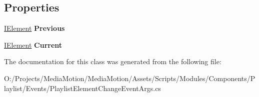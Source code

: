 \subsection*{Properties}
\begin{DoxyCompactItemize}
\item 
\hypertarget{class_media_motion_1_1_modules_1_1_components_1_1_playlist_1_1_events_1_1_playlist_element_change_event_args_a2e8e1d85d13e7c7d96deb54bdb919fdf}{\hyperlink{interface_media_motion_1_1_core_1_1_models_1_1_interfaces_1_1_i_element}{I\+Element} {\bfseries Previous}}\label{class_media_motion_1_1_modules_1_1_components_1_1_playlist_1_1_events_1_1_playlist_element_change_event_args_a2e8e1d85d13e7c7d96deb54bdb919fdf}

\item 
\hypertarget{class_media_motion_1_1_modules_1_1_components_1_1_playlist_1_1_events_1_1_playlist_element_change_event_args_a11fd9c96208baf04f8ed428cddb37578}{\hyperlink{interface_media_motion_1_1_core_1_1_models_1_1_interfaces_1_1_i_element}{I\+Element} {\bfseries Current}}\label{class_media_motion_1_1_modules_1_1_components_1_1_playlist_1_1_events_1_1_playlist_element_change_event_args_a11fd9c96208baf04f8ed428cddb37578}

\end{DoxyCompactItemize}


The documentation for this class was generated from the following file\+:\begin{DoxyCompactItemize}
\item 
O\+:/\+Projects/\+Media\+Motion/\+Media\+Motion/\+Assets/\+Scripts/\+Modules/\+Components/\+Playlist/\+Events/Playlist\+Element\+Change\+Event\+Args.\+cs\end{DoxyCompactItemize}
